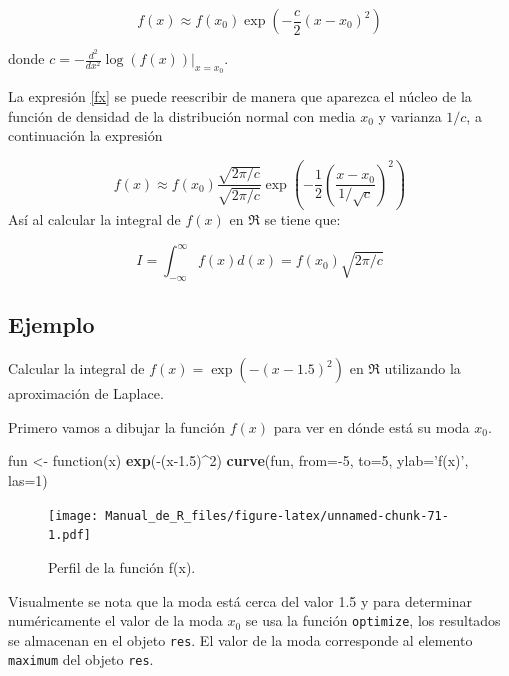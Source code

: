 \documentclass[10pt,]{krantz}
\makeatletter
\newenvironment{Shaded}{\begin{snugshade}}{\end{snugshade}}
\newcommand{\KeywordTok}[1]{\textcolor[rgb]{0.13,0.29,0.53}{\textbf{{#1}}}}
\newcommand{\DataTypeTok}[1]{\textcolor[rgb]{0.13,0.29,0.53}{{#1}}}
\newcommand{\DecValTok}[1]{\textcolor[rgb]{0.00,0.00,0.81}{{#1}}}
\newcommand{\FloatTok}[1]{\textcolor[rgb]{0.00,0.00,0.81}{{#1}}}
\newcommand{\StringTok}[1]{\textcolor[rgb]{0.31,0.60,0.02}{{#1}}}
\newcommand{\NormalTok}[1]{{#1}}
\newenvironment{kframe}{%
\medskip{}
\setlength{\fboxsep}{.8em}
 \def\at@end@of@kframe{}%
 \ifinner\ifhmode%
  \def\at@end@of@kframe{\end{minipage}}%
  \begin{minipage}{\columnwidth}%
 \fi\fi%
 \def\FrameCommand##1{\hskip\@totalleftmargin \hskip-\fboxsep
 \colorbox{shadecolor}{##1}\hskip-\fboxsep
     \hskip-\linewidth \hskip-\@totalleftmargin \hskip\columnwidth}%
 \MakeFramed {\advance\hsize-\width
   \@totalleftmargin\z@ \linewidth\hsize
   \@setminipage}}%
 {\par\unskip\endMakeFramed%
 \at@end@of@kframe}
\renewenvironment{Shaded}{\begin{kframe}}{\end{kframe}}
\makeatother
\begin{document}
\begin{equation} \label{fx}
f(x) \approx f(x_0)  \exp \left( -\frac{c}{2} (x-x_0)^2 \right)
\end{equation}

donde \(c=-\frac{d^2}{dx^2} \log(f(x)) \bigg|_{x=x_0}\).

La expresión \ref{fx} se puede reescribir de manera que aparezca el
núcleo de la función de densidad de la distribución normal con media
\(x_0\) y varianza \(1/c\), a continuación la expresión

\[
f(x) \approx f(x_0) \frac{\sqrt{2 \pi / c}}{\sqrt{2 \pi / c}}  \exp \left( -\frac{1}{2} \left( \frac{x-x_0}{1/\sqrt{c}} \right)^2 \right)
\] Así al calcular la integral de \(f(x)\) en \(\Re\) se tiene que:

\begin{equation} \label{aprox_laplace}
I = \int_{-\infty}^{\infty} f(x) d(x) = f(x_0) \sqrt{2 \pi / c}
\end{equation}

\subsection*{Ejemplo}\label{ejemplo-19}


Calcular la integral de \(f(x)=\exp \left( -(x-1.5)^2 \right)\) en
\(\Re\) utilizando la aproximación de Laplace.

Primero vamos a dibujar la función \(f(x)\) para ver en dónde está su
moda \(x_0\).

\begin{Shaded}
\begin{Highlighting}[]
\NormalTok{fun <-}\StringTok{ }\NormalTok{function(x) }\KeywordTok{exp}\NormalTok{(-(x}\FloatTok{-1.5}\NormalTok{)^}\DecValTok{2}\NormalTok{)}
\KeywordTok{curve}\NormalTok{(fun, }\DataTypeTok{from=}\NormalTok{-}\DecValTok{5}\NormalTok{, }\DataTypeTok{to=}\DecValTok{5}\NormalTok{, }\DataTypeTok{ylab=}\StringTok{'f(x)'}\NormalTok{, }\DataTypeTok{las=}\DecValTok{1}\NormalTok{)}
\end{Highlighting}
\end{Shaded}

\begin{figure}[htbp]
\centering
\texttt{[image: Manual\_de\_R\_files/figure-latex/unnamed-chunk-71-1.pdf]}
\caption{\label{fig:unnamed-chunk-71}Perfil de la función f(x).}
\end{figure}

Visualmente se nota que la moda está cerca del valor 1.5 y para
determinar numéricamente el valor de la moda \(x_0\) se usa la función
\texttt{optimize}, los resultados se almacenan en el objeto
\texttt{res}. El valor de la moda corresponde al elemento
\texttt{maximum} del objeto \texttt{res}.
\end{document}
